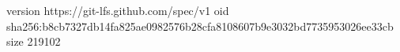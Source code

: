version https://git-lfs.github.com/spec/v1
oid sha256:b8cb7327db14fa825ae0982576b28cfa8108607b9e3032bd7735953026ee33cb
size 219102
